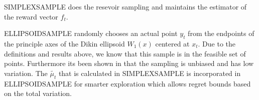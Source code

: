 SIMPLEXSAMPLE does the resevoir sampling and maintains the estimator of the reward vector
$f_t$. 

ELLIPSOIDSAMPLE randomly chooses an actual point $y_t$ from the endpoints of the
principle axes of the Dikin ellipsoid $W_1(x)$ centered at $x_t$. Due to the definitions and 
results above, we know that this sample is in the feasible set of points. Furthermore its been shown in \citep{abernethy} that the sampling is unbiased and has low variation.
The  $\tilde{\mu_t}$ that is calculated in SIMPLEXSAMPLE is incorporated in ELLIPSOIDSAMPLE for smarter exploration which allows regret bounds based on the total
variation. 
